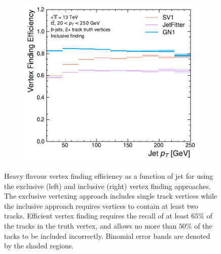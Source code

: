 \begin{figure}[!htbp]
\begin{subfigure}[b]{0.48\textwidth}
        \includegraphics[width=\textwidth]{chapters/gnn_tagger/figs/results/tracks/ttbar/ttbar_bjet_vert_eff_2+_track_incl.pdf}
    \end{subfigure}
    \caption{
        Heavy flavour vertex finding efficiency as a function of jet \pt for \ttbarbjets using the exclusive (left) and inclusive (right) vertex finding approaches.
        The exclusive vertexing approach includes single track vertices while the inclusive approach requires vertices to contain at least two tracks.
        Efficient vertex finding requires the recall of at least $65\%$ of the tracks in the truth vertex, and allows no more than $50\%$ of the tacks to be included incorrectly.
        Binomial error bands are denoted by the shaded regions.
        }
    \label{fig:ttbar_vert_eff}
\end{figure}

